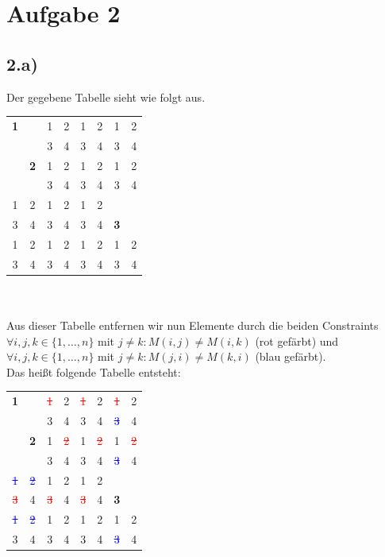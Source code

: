 \documentclass[a4paper]{article}
\begin{document}
\section*{Aufgabe 2}
\subsection*{2.a)}
Der gegebene Tabelle sieht wie folgt aus.\\

\begin{tabular}{|cc|cc|cc|cc|}
\hline
\textbf{1} &  & 1 & 2 & 1 & 2 & 1 & 2\\
  &  & 3 & 4 & 3 & 4 & 3 & 4\\
\hline
 & \textbf{2} & 1 & 2 & 1 & 2 & 1 & 2\\
  &  & 3 & 4 & 3 & 4 & 3 & 4\\
\hline
1 & 2 & 1 & 2 & 1 & 2 &  & \\
 3 & 4 & 3 & 4 & 3 & 4 & \textbf{3} & \\
\hline
1 & 2 & 1 & 2 & 1 & 2 & 1 & 2\\
 3 & 4 & 3 & 4 & 3 & 4 & 3 & 4\\
\hline
\end{tabular} \\
\\
Aus dieser Tabelle entfernen wir nun Elemente durch die beiden Constraints \\
$\forall i,j,k \in \{ 1, \ldots ,n\}$ mit $j \ne k: M(i,j) \ne M(i,k)$ (rot gef\"arbt) und \\
$\forall i,j,k \in \{ 1, \ldots ,n\}$ mit $j \ne k: M(j,i) \ne M(k,i)$ (blau gef\"arbt).\\
Das hei\ss t folgende Tabelle entsteht:\\

\begin{tabular}{|cc|cc|cc|cc|}
\hline
\textbf{1} &  & \textcolor{red}{\sout{1}} & 2 & \textcolor{red}{\sout{1}} & 2 & \textcolor{red}{\sout{1}} & 2\\
  &  & 3 & 4 & 3 & 4 & \textcolor{blue}{\sout{3}} & 4\\
\hline
 & \textbf{2} & 1 & \textcolor{red}{\sout{2}} & 1 & \textcolor{red}{\sout{2}} & 1 & \textcolor{red}{\sout{2}}\\
  &  & 3 & 4 & 3 & 4 & \textcolor{blue}{\sout{3}} & 4\\
\hline
\textcolor{blue}{\sout{1}} & \textcolor{blue}{\sout{2}} & 1 & 2 & 1 & 2 &  & \\
 \textcolor{red}{\sout{3}} & 4 & \textcolor{red}{\sout{3}} & 4 & \textcolor{red}{\sout{3}} & 4 & \textbf{3} & \\
\hline
\textcolor{blue}{\sout{1}} & \textcolor{blue}{\sout{2}} & 1 & 2 & 1 & 2 & 1 & 2\\
 3 & 4 & 3 & 4 & 3 & 4 & \textcolor{blue}{\sout{3}} & 4\\
\hline
\end{tabular} \\
\end{document}
